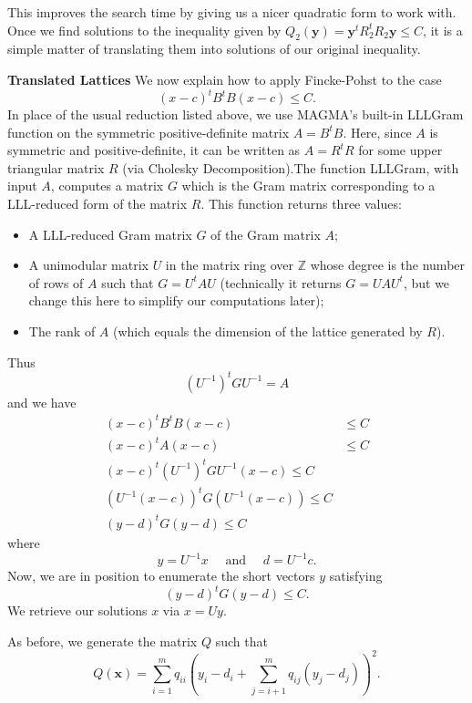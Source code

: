 This improves the search time by giving us a nicer quadratic form to work with. Once we find solutions to the inequality given by $Q_2(\mathbf{y}) = \mathbf{y}^tR_2^tR_2\mathbf{y} \leq C$, it is a simple matter of translating them into solutions of our original inequality.


\textbf{Translated Lattices}
We now explain how to apply Fincke-Pohst to the case
\[(x-c)^tB^tB(x-c) \leq C.\]
In place of the usual reduction listed above, we use MAGMA's built-in LLLGram function on the symmetric positive-definite matrix $A = B^tB$. Here, since $A$ is symmetric and positive-definite, it can be written as $A = R^tR$ for some upper triangular matrix $R$ (via Cholesky Decomposition).The function LLLGram, with input $A$, computes a matrix $G$ which is the Gram matrix corresponding to a LLL-reduced form of the matrix $R$. This function returns three values:
\begin{itemize}
\item A LLL-reduced Gram matrix $G$ of the Gram matrix $A$;
\item A unimodular matrix $U$ in the matrix ring over $\mathbb{Z}$ whose degree is the number of rows of $A$ such that $G=U^tAU$ (technically it returns $G=UAU^t$, but we change this here to simplify our computations later);
\item The rank of $A$ (which equals the dimension of the lattice generated by $R$).
\end{itemize}

Thus
\[(U^{-1})^tGU^{-1} = A\]
and we have
\begin{align*}
(x-c)^tB^tB(x-c) & \leq C\\
(x-c)^tA(x-c) & \leq C\\
(x-c)^t(U^{-1})^tGU^{-1}(x-c) \leq C\\
\left(U^{-1}(x-c)\right)^tG \left(U^{-1}(x-c)\right) \leq C\\
\left(y-d\right)^tG \left(y-d\right) \leq C
\end{align*}
where
\[y = U^{-1}x \quad \text{ and } \quad d = U^{-1}c.\]
Now, we are in position to enumerate the short vectors $y$ satisfying 
\[\left(y-d\right)^tG \left(y-d\right) \leq C.\]
We retrieve our solutions $x$ via $x = Uy$.

As before, we generate the matrix $Q$ such that 
\[ Q(\mathbf{x}) = \sum_{i=1}^m q_{ii}\left( y_i - d_i + \sum_{j=i+1}^m q_{ij}(y_j - d_j)\right)^2.\]

